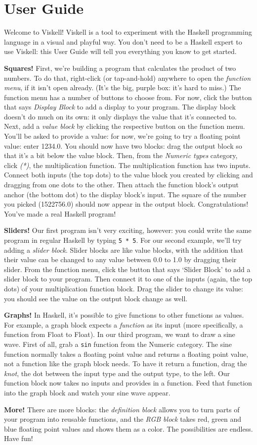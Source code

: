 \chapter{User Guide}
\label{chap:Guide}

Welcome to Viskell! Viskell is a tool to experiment with the Haskell programming language in a visual and playful way.
You don't need to be a Haskell expert to use Viskell: this User Guide will tell you everything you know to get started.

\textbf{Squares!}
First, we're building a program that calculates the product of two numbers.
To do that, right-click (or tap-and-hold) anywhere to open the \emph{function menu}, if it isn't open already.
(It's the big, purple box: it's hard to miss.)
The function menu has a number of buttons to choose from.
For now, click the button that says \emph{Display Block} to add a display to your program.
The display block doesn't do much on its own: it only displays the value that it's connected to.
Next, add a \emph{value block} by clicking the respective button on the function menu.
You'll be asked to provide a value: for now, we're going to try a floating point value: enter 1234.0.
You should now have two blocks: drag the output block so that it's a bit below the value block.
Then, from the \emph{Numeric types} category, click \emph{(*)}, the multiplication function.
The multiplication function has two inputs.
Connect both inputs (the top dots) to the value block you created by clicking and dragging from one dots to the other.
Then attach the function block's output anchor (the bottom dot) to the display block's input.
The square of the number you picked (1522756.0) should now appear in the output block.
Congratulations!
You've made a real Haskell program!

\textbf{Sliders!}
Our first program isn't very exciting, however: you could write the same program in regular Haskell by typing \texttt{5 * 5}.
For our second example, we'll try adding a \emph{slider block}.
Slider blocks are like value blocks, with the addition that their value can be changed to any value between 0.0 to 1.0 by dragging their slider.
From the function menu, click the button that says `Slider Block' to add a slider block to your program.
Then connect it to one of the inputs (again, the top dots) of your multiplication function block.
Drag the slider to change its value: you should see the value on the output block change as well.

\textbf{Graphs!}
In Haskell, it's possible to give functions to other functions as values.
For example, a graph block expects a \textit{function} as its input (more specifically, a function from Float to Float).
In our third program, we want to draw a sine wave.
First of all, grab a \texttt{sin} function from the Numeric category.
The sine function normally takes a floating point value and returns a floating point value, not a function like the graph block needs.
To have it return a function, drag the \textit{knot}, the dot between the input type and the output type, to the left.
Our function block now takes no inputs and provides in a function.
Feed that function into the graph block and watch your sine wave appear.

\textbf{More!}
There are more blocks: the \emph{definition block} allows you to turn parts of your program into reusable functions, and the \emph{RGB block} takes red, green and blue floating point values and shows them as a color. 
The possibilities are endless.
Have fun!
